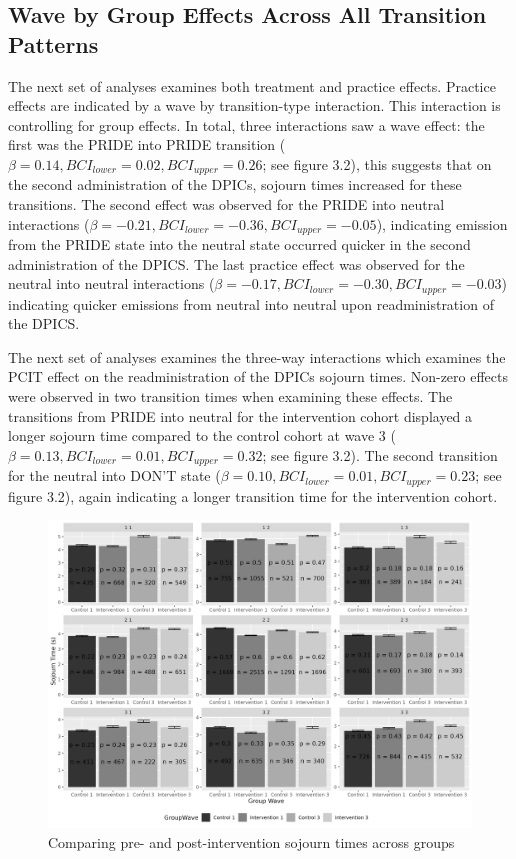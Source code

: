 \documentclass[12pt]{./styles/outhesis}
\begin{document}
\subsection{Wave by Group Effects Across All Transition Patterns}
The next set of analyses examines both treatment and practice effects.
Practice effects are indicated by a wave by transition-type interaction.
This interaction is controlling for group effects. In total, three
interactions saw a wave effect: the first was the PRIDE into PRIDE
transition (\(\beta=0.14, BCI_{lower}=0.02, BCI_{upper}=0.26\); see
figure 3.2), this suggests that on the second administration of the
DPICs, sojourn times increased for these transitions. The second effect
was observed for the PRIDE into neutral interactions
(\(\beta=-0.21, BCI_{lower}=-0.36, BCI_{upper}=-0.05\)), indicating
emission from the PRIDE state into the neutral state occurred quicker in
the second administration of the DPICS. The last practice effect was
observed for the neutral into neutral interactions
(\(\beta=-0.17, BCI_{lower}=-0.30, BCI_{upper}=-0.03\)) indicating
quicker emissions from neutral into neutral upon readministration of the
DPICS.

The next set of analyses examines the three-way interactions which
examines the PCIT effect on the readministration of the DPICs sojourn
times. Non-zero effects were observed in two transition times when
examining these effects. The transitions from PRIDE into neutral for the
intervention cohort displayed a longer sojourn time compared to the
control cohort at wave 3
(\(\beta=0.13, BCI_{lower}=0.01, BCI_{upper}=0.32\); see figure 3.2). The
second transition for the neutral into DON'T state
(\(\beta=0.10, BCI_{lower}=0.01, BCI_{upper}=0.23\); see figure 3.2),
again indicating a longer transition time for the intervention cohort.

\begin{figure}
\centering
\includegraphics[width=15cm]{figures/generalSojournTimes.png}
\caption{Comparing pre- and post-intervention sojourn times across
groups}
\end{figure}
\end{document}
